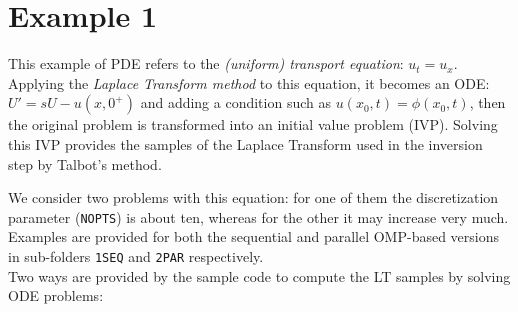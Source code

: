 \documentclass[a4paper,10pt]{report}%
\begin{document}
\section{Example 1}\label{SECT:EX1}
This example of PDE refers to the {\em (uniform) transport equation}: $u_t=u_x$.
Applying the {\em Laplace Transform method} to this equation, it becomes an ODE: $U' = sU - u(x,0^+)$ and
adding a condition such as $u(x_0,t) = \phi(x_0,t)$, then the original problem is transformed into an initial
value problem (IVP). Solving this IVP provides the samples of the Laplace Transform used in the inversion step by Talbot's method.

We consider two problems with this equation: for one of them the discretization parameter ({\tt NOPTS}) is about
ten, whereas for the other it may increase very much. Examples are provided for both the sequential and parallel
OMP-based versions in sub-folders {\tt 1SEQ} and {\tt 2PAR} respectively.
\\
Two ways are provided by the sample code to compute the LT samples by solving ODE problems:
\end{document}
